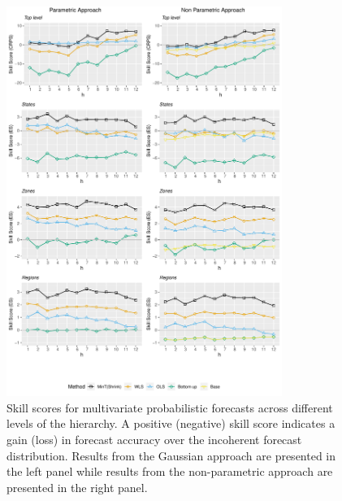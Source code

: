 \documentclass[12pt]{article}
\theoremstyle{definition}
\begin{document}
\begin{figure}
	\centering
	\small
	\includegraphics[width= 0.8\textwidth, height= 0.85\textheight]{Empirical-results/Results-ARIMA/ES_SS_Levels.pdf}
	\caption{Skill scores for multivariate probabilistic forecasts across different levels of the hierarchy. A positive (negative) skill score indicates a gain (loss) in forecast accuracy over the incoherent forecast distribution. Results from the Gaussian approach are presented in the left panel while results from the non-parametric approach are presented in the right panel.}\label{fig:EmpResults_Levels}
\end{figure}
\end{document}
